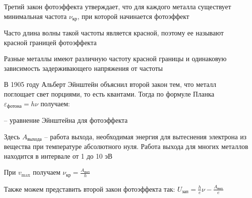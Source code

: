 \documentclass[12pt]{article}
\begin{document}
Третий закон фотоэффекта утверждает, что для каждого металла существует минимальная частота $\nu_{\text{кр}}$, при которой начинается фотоэффект

Часто длина волны такой частоты является красной, поэтому ее называют красной границей фотоэффекта

Разные металлы имеют различную частоту красной границы и одинаковую зависимость задерживающего напряжения от частоты

\mediumvspace

В 1905 году Альберт Эйнштейн объяснил второй закон тем, что металл поглощает свет порциями, то есть квантами. Тогда по формуле Планка $\varepsilon_{\text{фотона}} = h \nu$ получаем:

 -- уравнение Эйнштейна для фотоэффекта

\smallvspace

Здесь $A_{\text{выхода}}$ -- работа выхода, необходимая энергия для вытеснения электрона из вещества при температуре абсолютного нуля. Работа выхода для многих металлов находится в интервале от 1 до 10 эВ

При $v_{\max}$ получаем $\nu_\text{кр} = \frac{A_\text{вых}}{h}$

Также можем представить второй закон фотоэффекта так: $U_\text{зап} = \frac{h}{e} \nu - \frac{A_\text{вых}}{e}$

\end{document}
